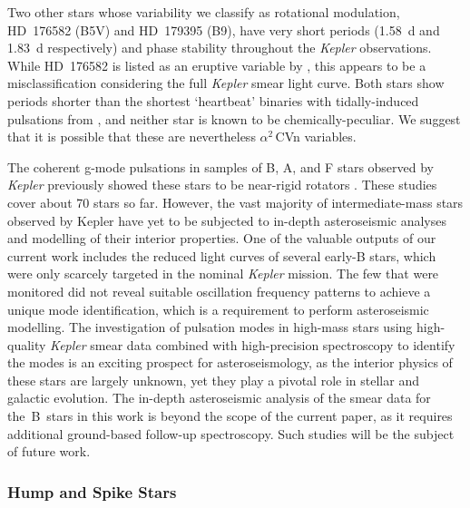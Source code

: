 \documentclass[a4paper,fleqn,usenatbib]{mnras}
\newcommand{\kepler}{\emph{Kepler}\xspace}
\begin{document}
Two other stars whose variability we classify as rotational modulation, HD~176582 (B5V) and HD~179395 (B9), have very short periods (1.58~d and 1.83~d respectively) and phase stability throughout the \kepler observations. While HD~176582 is listed as an eruptive variable by \citet{2016ApJ...829...23D}, this appears to be a misclassification considering the full \kepler smear light curve. Both stars show periods shorter than the shortest `heartbeat' binaries with tidally-induced pulsations from \citet{2012ApJ...753...86T}, and neither star is known to be chemically-peculiar. We suggest that it is possible that these are nevertheless $\alpha^2$\,CVn variables.

The coherent g-mode pulsations in samples of B, A, and F stars observed by \kepler previously showed these stars to be near-rigid rotators \citep{kurtz2014,saio15,triana15,vanreeth15,vanreeth16,vanreeth18,murphy16,schmid16,moravveji16,ouazzani17,papics17,aerts17,szewczuk18}. These studies cover about 70 stars so far. However, the vast majority of intermediate-mass stars observed by Kepler have yet to be subjected to in-depth asteroseismic analyses and modelling of their interior properties. One of the valuable outputs of our current work includes the reduced light curves of several early-B stars, which were only scarcely targeted in the nominal \kepler mission. The few that were monitored did not reveal suitable oscillation frequency patterns to achieve a unique mode identification, which is a requirement to perform asteroseismic modelling. The investigation of pulsation modes in high-mass stars using high-quality \kepler smear data combined with high-precision spectroscopy to identify the modes \citep[Chapter 6]{aertsbook} is an exciting prospect for asteroseismology, as the interior physics of these stars are largely unknown, yet they play a pivotal role in stellar and galactic evolution. The in-depth asteroseismic analysis of the smear data for the~B~stars in this work is beyond the scope of the current paper, as it requires additional ground-based follow-up spectroscopy. Such studies will be the subject of future work.

\subsubsection{Hump and Spike Stars}
\label{hs}
\end{document}
